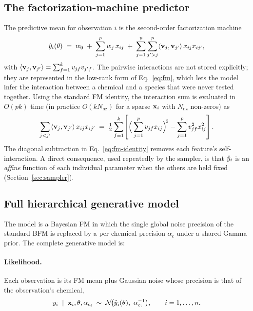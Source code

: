 \subsection{The factorization-machine predictor}
\label{sec:fm}

The predictive mean for observation $i$ is the second-order factorization
machine
\begin{equation}
  \hat{y}_i(\theta) \;=\; w_0 \;+\; \sum_{j=1}^{p} w_j\,x_{ij}
  \;+\; \sum_{j=1}^{p}\sum_{j'>j}^{p} \langle \mathbf{v}_j,\mathbf{v}_{j'}\rangle\,x_{ij}x_{ij'},
  \label{eq:fm}
\end{equation}
with $\langle \mathbf{v}_j,\mathbf{v}_{j'}\rangle=\sum_{f=1}^{k} v_{jf}v_{j'f}$. The pairwise
interactions are not stored explicitly; they are represented in the low-rank
form of Eq.~\eqref{eq:fm}, which lets the model infer the interaction between a
chemical and a species that were never tested together. Using the standard FM
identity, the interaction sum is evaluated in $O(pk)$ time (in practice $O(k
N_{\mathrm{nz}})$ for a sparse $\mathbf{x}_i$ with $N_{\mathrm{nz}}$ non-zeros) as
\begin{equation}
  \sum_{j<j'} \langle \mathbf{v}_j,\mathbf{v}_{j'}\rangle\,x_{ij}x_{ij'}
  \;=\; \tfrac{1}{2}\sum_{f=1}^{k}\!\left[
      \Big(\sum_{j=1}^{p} v_{jf}x_{ij}\Big)^{\!2}
      - \sum_{j=1}^{p} v_{jf}^{2}x_{ij}^{2}
  \right].
  \label{eq:fm-identity}
\end{equation}
The diagonal subtraction in Eq.~\eqref{eq:fm-identity} removes each feature's
self-interaction. A direct consequence, used repeatedly by the sampler, is that
$\hat{y}_i$ is an \emph{affine} function of each individual parameter when the
others are held fixed (Section~\ref{sec:sampler}).

\subsection{Full hierarchical generative model}
\label{sec:model}

The model is a Bayesian FM in which the single global noise precision of the
standard BFM is replaced by a per-chemical precision $\alpha_c$ under a shared
Gamma prior. The complete generative model is:

\paragraph{Likelihood.} Each observation is its FM mean plus Gaussian noise
whose precision is that of the observation's chemical,
\begin{equation}
  y_i \;\mid\; \mathbf{x}_i,\theta,\alpha_{c_i}
  \;\sim\; \mathcal{N}\!\big(\hat{y}_i(\theta),\ \alpha_{c_i}^{-1}\big),
  \qquad i=1,\dots,n.
  \label{eq:like}
\end{equation}

